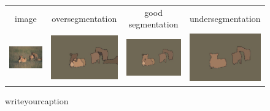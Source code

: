 \begin{figure}
\begin{center}
\begin{tabular}{ c  c  c  c }
 image & oversegmentation & good segmentation & undersegmentation \\
\includegraphics[width=3.15cm]{fig/false_seg/false_seg_2_1.jpg}
&\includegraphics[width=3.15cm]{fig/false_seg/false_seg_2_2.jpg}
&\includegraphics[width=3.15cm]{fig/false_seg/false_seg_2_3.jpg}
&\includegraphics[width=3.15cm]{fig/false_seg/false_seg_2_4.jpg}
\\
\end{tabular}
\end{center}
\caption{writeyourcaption}
\label{fig:false_seg}
\end{figure}
